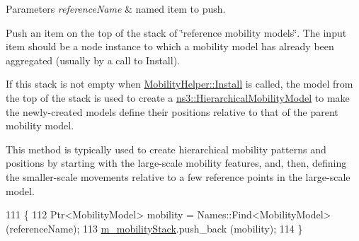 \begin{DoxyParams}{Parameters}
{\em reference\+Name} & named item to push.\\
\hline
\end{DoxyParams}
Push an item on the top of the stack of \char`\"{}reference mobility models\char`\"{}. The input item should be a node instance to which a mobility model has already been aggregated (usually by a call to Install).

If this stack is not empty when \hyperlink{classns3_1_1MobilityHelper_a07737960ee95c0777109cf2994dd97ae}{Mobility\+Helper\+::\+Install} is called, the model from the top of the stack is used to create a \hyperlink{classns3_1_1HierarchicalMobilityModel}{ns3\+::\+Hierarchical\+Mobility\+Model} to make the newly-\/created models define their positions relative to that of the parent mobility model.

This method is typically used to create hierarchical mobility patterns and positions by starting with the large-\/scale mobility features, and, then, defining the smaller-\/scale movements relative to a few reference points in the large-\/scale model. 
\begin{DoxyCode}
111 \{
112   Ptr<MobilityModel> mobility = Names::Find<MobilityModel> (referenceName);
113   \hyperlink{classns3_1_1MobilityHelper_afa6de1206985c5c37610f02de43b10d2}{m\_mobilityStack}.push\_back (mobility);
114 \}
\end{DoxyCode}
